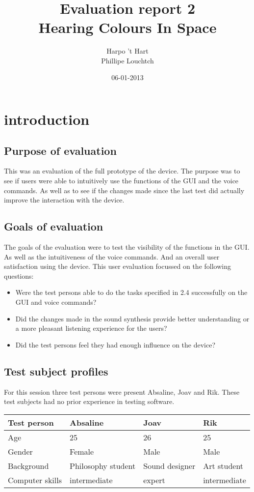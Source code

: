 \documentclass[11pt]{article}
\begin{document}
\title{Evaluation report 2\\ Hearing Colours In Space}
\author{Harpo 't Hart \\ Phillipe Louchtch}
\date{06-01-2013}
\maketitle

\tableofcontents

\section{introduction}
\subsection{Purpose of evaluation}
This was an evaluation of the full prototype of the device. The purpose was to see if users were able to intuitively use the functions of the GUI and the voice commands. As well as to see if the changes made since the last test did actually improve the interaction with the device.
\subsection{Goals of evaluation}
The goals of the evaluation were to test the visibility of the functions in the GUI. As well as the intuitiveness of the voice commands. And an overall user satisfaction using the device. This user evaluation focussed on the following questions:
\begin{itemize}
\item Were the test persons able to do the tasks specified in 2.4 successfully on the GUI and voice commands?
\item Did the changes made in the sound synthesis provide better understanding or a more pleasant listening experience for the users?
\item Did the test persons feel they had enough influence on the device?
\end{itemize}
\subsection{Test subject profiles}
For this session three test persons were present Absaline, Joav and Rik. These test subjects had no prior experience in testing software.
\begin{center}
    \begin{tabular}{| l | l | l | l|}
    \hline
     	Test person & Absaline & Joav & Rik \\ \hline
	Age & 25 & 26 & 25 \\ \hline
	Gender & Female & Male & Male \\ \hline
	Background & Philosophy student & Sound designer & Art student \\ \hline
	Computer skills & intermediate & expert & intermediate \\ \hline
    \end{tabular}
\end{center}
\end{document}
